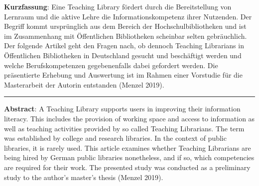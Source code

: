 \textbf{Kurzfassung}: Eine Teaching Library fördert durch die
Bereitstellung von Lernraum und die aktive Lehre die
Informationskompetenz ihrer Nutzenden. Der Begriff kommt ursprünglich
aus dem Bereich der Hochschulbibliotheken und ist im Zusammenhang mit
Öffentlichen Bibliotheken scheinbar selten gebräuchlich. Der folgende
Artikel geht den Fragen nach, ob dennoch Teaching Librarians in
Öffentlichen Bibliotheken in Deutschland gesucht und beschäftigt werden
und welche Berufskompetenzen gegebenenfalls dabei gefordert werden. Die
präsentierte Erhebung und Auswertung ist im Rahmen einer Vorstudie für
die Masterarbeit der Autorin entstanden (Menzel 2019).

\begin{center}\rule{0.5\linewidth}{0.5pt}\end{center}

\textbf{Abstract}: A Teaching Library supports users in improving their
information literacy. This includes the provision of working space and
access to information as well as teaching activities provided by so
called Teaching Librarians. The term was established by college and
research libraries. In the context of public libraries, it is rarely
used. This article examines whether Teaching Librarians are being hired
by German public libraries nonetheless, and if so, which competencies
are required for their work. The presented study was conducted as a
preliminary study to the author's master's thesis (Menzel 2019).

